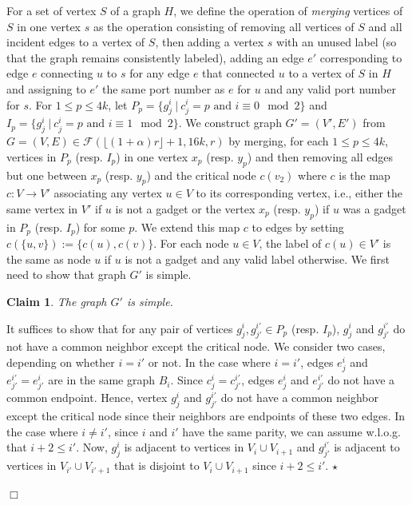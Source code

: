 \documentclass[11pt]{article}
\newtheorem{claim}{Claim}[section]
\newcommand{\qed}{\hfill $\Box$ \bigbreak}
\newenvironment{proof}{\noindent {\bf Proof.}}{\qed}
\newenvironment{proofclaim}{\noindent{\bf Proof of the claim.}}{\hfill$\star$}
\begin{document}
{\begin{proof}
For a set of vertex $S$ of a graph $H$, we define the operation of \emph{merging} vertices of $S$ in one vertex $s$ as the operation consisting of removing all vertices of $S$ and all incident edges to a vertex of $S$, then adding a vertex $s$ with an unused label (so that the graph remains consistently labeled), adding an edge $e'$ corresponding to edge $e$ connecting $u$ to $s$ for any edge $e$ that connected $u$ to a vertex of $S$ in $H$ and assigning to $e'$ the same port number as $e$ for $u$ and any valid port number for $s$. For $1\leq p\leq 4k$, let $P_p=\{g_j^i\ |\ c_j^i=p \mbox{ and } i \equiv 0 \mod{2}\}$ and $I_p=\{g_j^i\ |\ c_j^i=p \mbox{ and } i \equiv 1 \mod{2}\}$. We construct graph $G'=(V',E')$ from $G=(V,E)\in\mathcal{F}(\lfloor(1+\alpha)r\rfloor+1,16k,r)$ by merging, for each $1\leq p\leq 4k$, vertices in $P_p$ (resp. $I_p$) in one vertex $x_p$ (resp. $y_p$) and then removing all edges but one between $x_p$ (resp. $y_p$) and the critical node $c(v_2)$ where $c$ is the map $c:V\rightarrow V'$ associating any vertex $u\in V$ to its corresponding vertex, i.e., either the same vertex in $V'$ if $u$ is not a gadget or the vertex $x_p$ (resp. $y_p$) if $u$ was a gadget in $P_p$ (resp. $I_p$) for some $p$. We extend this map $c$ to edges by setting $c(\{u,v\}):=\{c(u),c(v)\}$. For each node $u\in V$, the label of $c(u)\in V'$ is the same as node $u$ if $u$ is not a gadget and any valid label otherwise. We first need to show that graph $G'$ is simple.

\begin{claim}
The graph $G'$ is simple.
\end{claim}

\begin{proofclaim}
It suffices to show that for any pair of vertices $g_j^i, g_{j'}^{i'} \in P_p$ (resp. $I_p$), $g_j^i$ and $g_{j'}^{i'}$ do not have a common neighbor except the critical node. We consider two cases, depending on whether $i=i'$ or not. In the case where $i=i'$, edges $e_j^i$ and $e_{j'}^{i'}=e_{j'}^{i}$ are in the same graph $B_i$. Since $c_j^i=c_{j'}^{i'}$, edges $e_{j}^{i}$ and $e_{j'}^{i'}$ do not have a common endpoint. Hence, vertex $g_{j}^{i}$ and $g_{j'}^{i'}$ do not have a common neighbor except the critical node since their neighbors are endpoints of these two edges. In the case where $i\neq i'$, since $i$ and $i'$ have the same parity, we can assume w.l.o.g. that $i+2\leq i'$. Now, $g_j^i$ is adjacent to vertices in $V_i\cup V_{i+1}$ and $g_{j'}^{i'}$ is adjacent to vertices in $V_{i'}\cup V_{i'+1}$ that is disjoint to $V_i\cup V_{i+1}$ since $i+2\leq i'$.
\end{proofclaim}


\end{proof}}
\end{document}

